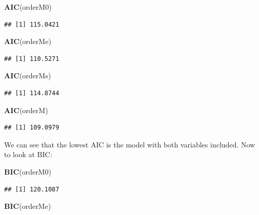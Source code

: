 \documentclass[
]{article}
\newenvironment{Shaded}{\begin{snugshade}}{\end{snugshade}}
\newcommand{\FunctionTok}[1]{\textcolor[rgb]{0.13,0.29,0.53}{\textbf{#1}}}
\newcommand{\NormalTok}[1]{#1}
\begin{document}
\begin{Shaded}
\begin{Highlighting}[]
\FunctionTok{AIC}\NormalTok{(orderM0)}
\end{Highlighting}
\end{Shaded}

\begin{verbatim}
## [1] 115.0421
\end{verbatim}

\begin{Shaded}
\begin{Highlighting}[]
\FunctionTok{AIC}\NormalTok{(orderMe)}
\end{Highlighting}
\end{Shaded}

\begin{verbatim}
## [1] 110.5271
\end{verbatim}

\begin{Shaded}
\begin{Highlighting}[]
\FunctionTok{AIC}\NormalTok{(orderMs)}
\end{Highlighting}
\end{Shaded}

\begin{verbatim}
## [1] 114.8744
\end{verbatim}

\begin{Shaded}
\begin{Highlighting}[]
\FunctionTok{AIC}\NormalTok{(orderM)}
\end{Highlighting}
\end{Shaded}

\begin{verbatim}
## [1] 109.0979
\end{verbatim}

We can see that the lowest AIC is the model with both variables
included. Now to look at BIC:

\begin{Shaded}
\begin{Highlighting}[]
\FunctionTok{BIC}\NormalTok{(orderM0)}
\end{Highlighting}
\end{Shaded}

\begin{verbatim}
## [1] 120.1087
\end{verbatim}

\begin{Shaded}
\begin{Highlighting}[]
\FunctionTok{BIC}\NormalTok{(orderMe)}
\end{Highlighting}
\end{Shaded}
\end{document}
